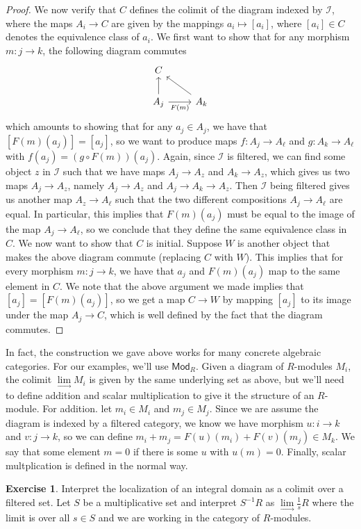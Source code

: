 \documentclass[psamsfonts]{amsart}
\theoremstyle{definition}
\newtheorem{exer}[thm]{Exercise}
\theoremstyle{remark}
\newcommand{\inv}{^{-1}}
\begin{document}
\begin{proof}
We now verify that $C$ defines the colimit of the diagram indexed by $\mathscr{I}$, where the maps $A_i \to C$ are given by the mappings $a_i \mapsto [a_i]$, where $[a_i] \in C$ denotes the equivalence class of $a_i$. We first want to show that for any morphism $m: j \to k$, the following diagram commutes 
$$\begin{tikzcd}
C \\
A_j \arrow[u] \arrow[r,"F(m)"'] & A_k \arrow[ul]
\end{tikzcd}$$
which amounts to showing that for any $a_j \in A_j$, we have that $[F(m)(a_j) ] = [a_j]$, so we want to produce maps $f : A_j \to A_\ell$ and $g: A_k \to A_\ell$ with $f(a_j) = (g \circ F(m))(a_j)$. Again, since $\mathscr{I}$ is filtered, we can find some object $z$ in $\mathscr{I}$ such that we have maps $A_j \to A_z$ and $A_k \to A_z$, which gives us two maps $A_j \to A_z$, namely $A_j \to A_z$ and $A_j \to A_k \to A_z$. Then $\mathscr{I}$ being filtered gives us another map $A_z \to A_\ell$ such that the two different compositions $A_j \to A_\ell$ are equal. In particular, this implies that $F(m)(a_j)$ must be equal to the image of the map $A_j \to A_\ell$, so we conclude that they define the same equivalence class in $C$. We now want to show that $C$ is initial. Suppose $W$ is another object that makes the above diagram commute (replacing $C$ with $W$). This implies that for every morphism $m : j \to k$, we have that $a_j$ and $F(m)(a_j)$ map to the same element in $C$. We note that the above argument we made implies that $[a_j] = [F(m)(a_j)]$, so we get a map $C \to W$ by mapping $[a_j]$ to its image under the map $A_j \to C$, which is well defined by the fact that the diagram commutes.
\end{proof}
In fact, the construction we gave above works for many concrete algebraic categories. For our examples, we'll use $\mathsf{Mod}_R$. Given a diagram of $R$-modules $M_i$, the colimit $\lim\limits_\to M_i$ is given by the same underlying set as above, but we'll need to define addition and scalar multiplication to give it the structure of an $R$-module. For addition. let $m_i \in M_i$ and $m_j \in M_j$. Since we are assume the diagram is indexed by a filtered category, we know we have morphism $u: i \to k$ and $v : j \to k$, so we can define $m_i + m_j = F(u)(m_i) + F(v)(m_j) \in M_k$. We say that some element $m = 0$ if there is some $u$ with $u(m) = 0$. Finally, scalar multplication is defined in the normal way.
%
\begin{exer}
Interpret the localization of an integral domain as a colimit over a filtered set. Let $S$ be a multiplicative set and interpret $S\inv R$ as $\lim\limits_\to \frac{1}{s}R$ where the limit is over all $s \in S$ and we are working in the category of $R$-modules.
\end{exer}
\end{document}
